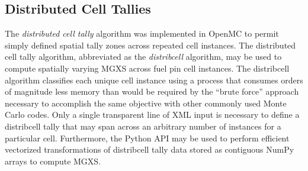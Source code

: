 \subsection{Distributed Cell Tallies}
\label{subsec:distribcells}


The \emph{distributed cell tally} algorithm was implemented in OpenMC \cite{lax2014distribcell} to permit simply defined spatial tally zones across repeated cell instances. The distributed cell tally algorithm, abbreviated as the \emph{distribcell} algorithm, may be used to compute spatially varying MGXS across fuel pin cell instances. The distribcell algorithm classifies each unique cell instance using a process that consumes orders of magnitude less memory than would be required by the ``brute force'' approach necessary to accomplish the same objective with other commonly used Monte Carlo codes. Only a single transparent line of XML input is necessary to define a distribcell tally that may span across an arbitrary number of instances for a particular cell. Furthermore, the Python API may be used to perform efficient vectorized transformations of distribcell tally data stored as contiguous NumPy arrays to compute MGXS.
